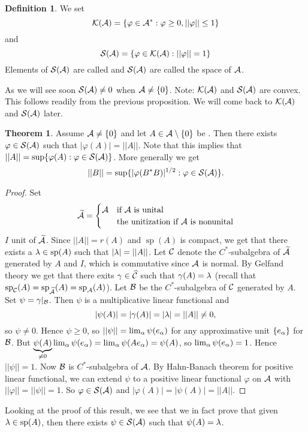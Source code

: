\documentclass[10pt,english,a4paper]{article}
\theoremstyle{definition}
\newtheorem*{definition}{Definition}
\newtheorem*{theorem}{Theorem}
\let\emph\relax %
\def\tAs{\widetilde{\As}}
\DeclareMathOperator{\Sp}{sp}
\def\vphi{\varphi}
\begin{document}
\begin{definition}
    We set \[\Ks(\As) = \{ \vphi \in \As^* : \vphi\geq 0, ||\vphi||\leq 1 \}\]
    and 
    \[ \Ss(\As) = \{ \vphi \in \Ks(\As) : ||\vphi||=1 \} \]
    Elements of $\mathcal{S}(\mathcal{A})$ are called \emph{states} and $\mathcal{S}(\mathcal{A})$ are called the 
    \emph{state} space of $\mathcal{A}$. 
\end{definition}

As we will see soon $\mathcal{S}(\mathcal{A}) \neq 0$ when $\mathcal{A} \neq \{0\}$.
Note:  $\mathcal{K}(\mathcal{A})$ and $\mathcal{S}(\mathcal{A})$ are convex. This follows readily from the previous 
proposition. We will come back to $\mathcal{K}(\mathcal{A})$ and $\mathcal{S}(\mathcal{A})$ later. 
\begin{theorem}
    Assume $\mathcal{A} \neq \{0\}$ and let $A \in \mathcal{A}\setminus\{0\}$ be \emph{normal}.
    Then there exists $\vphi\in \Ss(\As)$ such that 
    $|\vphi(A)| = ||A||$. 
    Note that this implies that $||A|| = \sup\{ \vphi(A) : \vphi \in \Ss(\As)\}$.
    More generally we get 
    \[ ||B|| = \sup\{ |\vphi(B^*B)|^{1/2} : \vphi \in \Ss(\As)\}. \]

\end{theorem}

\begin{proof}
    Set 
\[\tAs = \begin{cases} \As &\text{if $\As$ is unital} \\&\text{the unitization if $\As$ is nonunital} \end{cases}\]
$I$ unit of $\tAs$. Since $||A||=r(A)$ and $\Sp(A)$ is compact, we get that 
there exists a $\la \in \Sp(A)$ such that $|\lambda| = ||A||$.
Let $\mathcal{C}$ denote the $C^*$-subalgebra of $\tAs$ generated by 
$A$ and $I$, which is commutative since $\mathcal{A}$ is normal. 
By Gelfand theory we get that there exits $\gamma \in \widehat{\mathcal{C}}$
such that $\gamma(A) = \lambda$ (recall that $\Sp_{\Cs}(A) = \Sp_{\tAs}(A) = \Sp_{\As}(A)$).
Let $\mathcal{B}$ be the $C^*$-subalgebra of $\mathcal{C}$ generated by $A$. Set $\psi=\gamma\lvert_{\mathcal{B}}$.
Then $\psi$ is a multiplicative linear functional and 
\[ |\psi(A)| = |\gamma(A)| = |\lambda| = ||A|| \neq 0, \] 
so $\psi\neq0$.
Hence $\psi\geq 0$, so $||\psi|| = \lim_{\alpha}\psi(e_{\alpha})$ for any approximative 
unit $\{e_{\alpha}\}$ for $\mathcal{B}$. But $\underbrace{\psi(A)}_{\neq 0} \lim_{\alpha}\psi(e_{\alpha}) 
= \lim_{\alpha}\psi(Ae_{\alpha}) = \psi(A)$, so $\lim_{\alpha}\psi(e_{\alpha})=1$.
Hence $||\psi||=1$. Now $\mathcal{B}$ is $C^*$-subalgebra of $\mathcal{A}$. By Hahn-Banach theorem 
for positive linear functional, we can extend $\psi$ to a positive linear functional 
$\vphi$ on $\mathcal{A}$ with $||\vphi|| = ||\psi|| = 1$.
So $\vphi \in \Ss(\As)$ and $|\vphi(A)| = |\psi(A)|=||A||$.
\end{proof}
Looking at the proof of this result, we see that we in fact prove that given 
$\la \in \Sp(A)$, then there exists $\psi \in \mathcal{S}(\mathcal{A})$ such that $\psi(A) = \lambda$.
\end{document}
